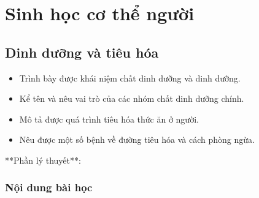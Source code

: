 \documentclass[Main.tex]{subfiles}
\begin{document}
\chapter{Sinh học cơ thể người}
\section{Dinh dưỡng và tiêu hóa}
\begin{Muctieu}
	\begin{itemize}
		\item Trình bày được khái niệm chất dinh dưỡng và dinh dưỡng.
		\item Kể tên và nêu vai trò của các nhóm chất dinh dưỡng chính.
		\item Mô tả được quá trình tiêu hóa thức ăn ở người.
		\item Nêu được một số bệnh về đường tiêu hóa và cách phòng ngừa.
	\end{itemize}
\end{Muctieu}
\begin{kd}
\end{kd}

**Phần lý thuyết**:
\subsection{Nội dung bài học}
\end{document}
